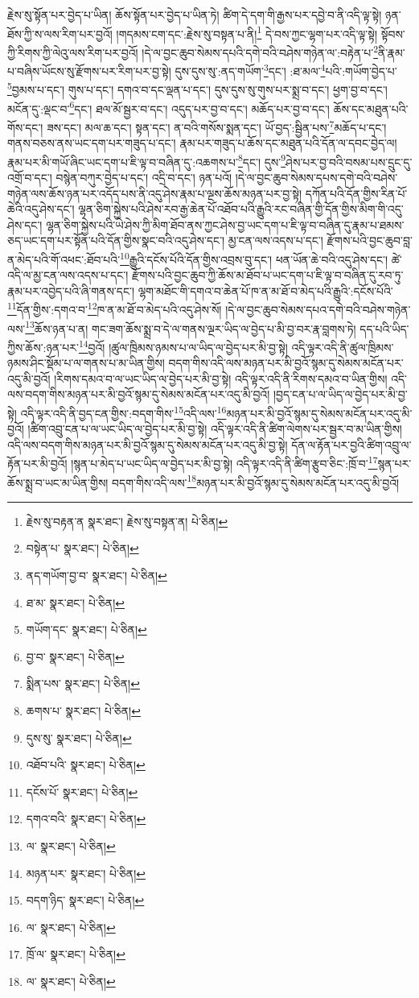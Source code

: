 རྗེས་སུ་སྟོན་པར་བྱེད་པ་ཡིན། ཆོས་སྟོན་པར་བྱེད་པ་ཡིན་ཏེ། ཚིག་དེ་དག་གི་རྒྱས་པར་དབྱེ་བ་ནི་འདི་ལྟ་སྟེ། ཉན་ཐོས་ཀྱི་ས་ལས་རིག་པར་བྱའོ། །གདམས་ངག་དང་:རྗེས་སུ་བསྟན་པ་ནི།\footnote{རྗེས་སུ་བརྟན་ན  སྣར་ཐང་། རྗེས་སུ་བསྟན་ན།  པེ་ཅིན། } དེ་བས་ཀྱང་ལྷག་པར་འདི་ལྟ་སྟེ། སྟོབས་ཀྱི་རིགས་ཀྱི་ལེའུ་ལས་རིག་པར་བྱའོ། །དེ་ལ་བྱང་ཆུབ་སེམས་དཔའི་དགེ་བའི་བཤེས་གཉེན་ལ་:བརྟེན་པ་\footnote{བསྟེན་པ་  སྣར་ཐང་།  པེ་ཅིན། }ནི་རྣམ་པ་བཞིས་ཡོངས་སུ་རྫོགས་པར་རིག་པར་བྱ་སྟེ། དུས་དུས་སུ་:ནད་གཡོག་\footnote{ནད་གཡོག་བྱ་བ་  སྣར་ཐང་།  པེ་ཅིན། }དང་། :ཐ་མལ་\footnote{ཐ་མ་  སྣར་ཐང་།  པེ་ཅིན། }པའི་:གཡོག་བྱེད་པ་\footnote{གཡོག་དང་  སྣར་ཐང་།  པེ་ཅིན། }བྱམས་པ་དང་། གུས་པ་དང་། དགའ་བ་དང་ལྡན་པ་དང་། དུས་དུས་སུ་གུས་པར་སྨྲ་བ་དང་། ཕྱག་བྱ་བ་དང་། མངོན་དུ་:ལྡང་བ་\footnote{བྱ་བ་  སྣར་ཐང་།  པེ་ཅིན། }དང་། ཐལ་མོ་སྦྱར་བ་དང་། འདུད་པར་བྱ་བ་དང་། མཆོད་པར་བྱ་བ་དང་། ཆོས་དང་མཐུན་པའི་གོས་དང་། ཟས་དང་། མལ་ཆ་དང་། སྟན་དང་། ན་བའི་གསོས་སྨན་དང་། ཡོ་བྱད་:སྦྱིན་པས་\footnote{སྨིན་པས་  སྣར་ཐང་།  པེ་ཅིན། }མཆོད་པ་དང་། གནས་བཅས་ནས་ཡང་དག་པར་གཟུད་པ་དང་། རྣམ་པར་གཟུད་པ་ཆོས་དང་མཐུན་པའི་དོན་ལ་དབང་བྱེད་ལ། རྣམ་པར་མི་གཡོ་ཞིང་ཡང་དག་པ་ཇི་ལྟ་བ་བཞིན་དུ་:འཆགས་པ་\footnote{ཆགས་པ་  སྣར་ཐང་།  པེ་ཅིན། }དང་། དུས་\footnote{དུས་སུ་  སྣར་ཐང་།  པེ་ཅིན། }ཤེས་པར་བྱ་བའི་བསམ་པས་དྲུང་དུ་འགྲོ་བ་དང་། བསྙེན་བཀུར་བྱེད་པ་དང་། འདྲི་བ་དང་། ཉན་པའོ། །དེ་ལ་བྱང་ཆུབ་སེམས་དཔས་དགེ་བའི་བཤེས་གཉེན་ལས་ཆོས་ཉན་པར་འདོད་པས་ནི་འདུ་ཤེས་རྣམ་པ་ལྔས་ཆོས་མཉན་པར་བྱ་སྟེ། དཀོན་པའི་དོན་གྱིས་རིན་པོ་ཆེའི་འདུ་ཤེས་དང་། ལྷན་ཅིག་སྐྱེས་པའི་ཤེས་རབ་རྒྱ་ཆེན་པོ་འཐོབ་པའི་རྒྱུའི་རང་བཞིན་གྱི་དོན་གྱིས་མིག་གི་འདུ་ཤེས་དང་། ལྷན་ཅིག་སྐྱེས་པའི་ཡེ་ཤེས་ཀྱི་མིག་ཐོབ་ནས་ཀྱང་ཤེས་བྱ་ཡང་དག་པ་ཇི་ལྟ་བ་བཞིན་དུ་རྣམ་པ་ཐམས་ཅད་ཡང་དག་པར་སྟོན་པའི་དོན་གྱིས་སྣང་བའི་འདུ་ཤེས་དང་། མྱ་ངན་ལས་འདས་པ་དང་། རྫོགས་པའི་བྱང་ཆུབ་བླ་ན་མེད་པའི་གོ་འཕང་:ཐོབ་པའི་\footnote{འཐོབ་པའི་  སྣར་ཐང་།  པེ་ཅིན། }རྒྱུའི་དངོས་པོའི་དོན་གྱིས་འབྲས་བུ་དང་། ཕན་ཡོན་ཆེ་བའི་འདུ་ཤེས་དང་། ཚེ་འདི་ལ་མྱ་ངན་ལས་འདས་པ་དང་། རྫོགས་པའི་བྱང་ཆུབ་ཀྱི་ཆོས་མ་ཐོབ་པ་ཡང་དག་པ་ཇི་ལྟ་བ་བཞིན་དུ་རབ་ཏུ་རྣམ་པར་འབྱེད་པའི་ཞི་གནས་དང་། ལྷག་མཐོང་གི་དགའ་བ་ཆེན་པོ་ཁ་ན་མ་ཐོ་བ་མེད་པའི་རྒྱུའི་:དངོས་པོའི་\footnote{དངོས་པོ་  སྣར་ཐང་།  པེ་ཅིན། }དོན་གྱིས་:དགའ་བ་\footnote{དགའ་བའི་  སྣར་ཐང་།  པེ་ཅིན། }ཁ་ན་མ་ཐོ་བ་མེད་པའི་འདུ་ཤེས་སོ། །དེ་ལ་བྱང་ཆུབ་སེམས་དཔའ་དགེ་བའི་བཤེས་གཉེན་ལས་\footnote{ལ་  སྣར་ཐང་།  པེ་ཅིན། }ཆོས་ཉན་པ་ན། གང་ཟག་ཆོས་སྨྲ་བ་དེ་ལ་གནས་ལྔར་ཡིད་ལ་བྱེད་པ་མི་བྱ་བར་རྣ་བླགས་ཏེ། དད་པའི་ཡིད་ཀྱིས་ཆོས་:ཉན་པར་\footnote{མཉན་པར་  སྣར་ཐང་།  པེ་ཅིན། }བྱའོ། །ཚུལ་ཁྲིམས་ཉམས་པ་ལ་ཡིད་ལ་བྱེད་པར་མི་བྱ་སྟེ། འདི་ལྟར་འདི་ནི་ཚུལ་ཁྲིམས་ཉམས་ཤིང་སྡོམ་པ་ལ་གནས་པ་མ་ཡིན་གྱིས། བདག་གིས་འདི་ལས་མཉན་པར་མི་བྱའོ་སྙམ་དུ་སེམས་མངོན་པར་འདུ་མི་བྱའོ། །རིགས་དམའ་བ་ལ་ཡང་ཡིད་ལ་བྱེད་པར་མི་བྱ་སྟེ། འདི་ལྟར་འདི་ནི་རིགས་དམའ་བ་ཡིན་གྱིས། འདི་ལས་བདག་གིས་མཉན་པར་མི་བྱའོ་སྙམ་དུ་སེམས་མངོན་པར་འདུ་མི་བྱའོ། །བྱད་ངན་པ་ལ་ཡིད་ལ་བྱེད་པར་མི་བྱ་སྟེ། འདི་ལྟར་འདི་ནི་བྱད་ངན་གྱིས་:བདག་གིས་\footnote{བདག་ཉིད་  སྣར་ཐང་།  པེ་ཅིན། }འདི་ལས་\footnote{ལ་  སྣར་ཐང་།  པེ་ཅིན། }མཉན་པར་མི་བྱའོ་སྙམ་དུ་སེམས་མངོན་པར་འདུ་མི་བྱའོ། །ཚིག་འབྲུ་ངན་པ་ལ་ཡང་ཡིད་ལ་བྱེད་པར་མི་བྱ་སྟེ། འདི་ལྟར་འདི་ནི་ཚིག་ལེགས་པར་སྦྱར་བ་མ་ཡིན་གྱིས། འདི་ལས་བདག་གིས་མཉན་པར་མི་བྱའོ་སྙམ་དུ་སེམས་མངོན་པར་འདུ་མི་བྱ་སྟེ། དོན་ལ་རྟོན་པར་བྱའི་ཚིག་འབྲུ་ལ་རྟོན་པར་མི་བྱའོ། །སྙན་པ་མེད་པ་ཡང་ཡིད་ལ་བྱེད་པར་མི་བྱ་སྟེ། འདི་ལྟར་འདི་ནི་ཚིག་རྩུབ་ཅིང་:ཁྲོ་བ་\footnote{ཁྲོ་ལ་  སྣར་ཐང་།  པེ་ཅིན། }སྙན་པར་ཆོས་སྨྲ་བ་ཡང་མ་ཡིན་གྱིས། བདག་གིས་འདི་ལས་\footnote{ལ་  སྣར་ཐང་།  པེ་ཅིན། }མཉན་པར་མི་བྱའོ་སྙམ་དུ་སེམས་མངོན་པར་འདུ་མི་བྱའོ། 